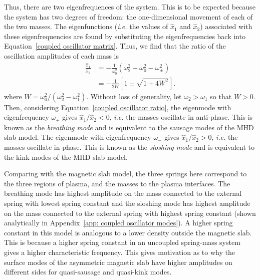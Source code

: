 Thus, there are two eigenfrequences of the system. This is to be expected because the system has two degrees of freedom: the one-dimensional movement of each of the two masses. The eigenfunctions (\textit{i.e.} the values of $\widehat{x}_1$ and $\widehat{x}_2$) associated with these eigenfrequencies are found by substituting the eigenfrequencies back into Equation~\eqref{coupled oscillator matrix}. Thus, we find that the ratio of the oscillation amplitudes of each mass is
\begin{align}
	\frac{\widehat{x}_1}{\widehat{x}_2} & = -\frac{1}{\omega_0^2}(\omega_2^2 + \omega_0^2 - \omega_\pm^2) \\
	& = -\frac{1}{2W}\left[1 \pm \sqrt{1 + 4W^2} \right]. \label{coupled oscillator ratio}
\end{align}
where $W = \omega_0^2 / (\omega_2^2 - \omega_1^2)$. Without loss of generality, let $\omega_2 > \omega_1$ so that $W > 0$. Then, considering Equation~\ref{coupled oscillator ratio}, the eigenmode with eigenfrequency $\omega_+$ gives $\widehat{x}_1 / \widehat{x}_2 < 0$, \textit{i.e.} the masses oscillate in anti-phase. This is known as the \textit{breathing mode} and is equivalent to the sausage modes of the MHD slab model. The eigenmode with eigenfrequency $\omega_-$ gives $\widehat{x}_1 / \widehat{x}_2 > 0$, \textit{i.e.} the masses oscillate in phase. This is known as the \textit{sloshing mode} and is equivalent to the kink modes of the MHD slab model.

Comparing with the magnetic slab model, the three springs here correspond to the three regions of plasma, and the masses to the plasma interfaces. The breathing mode has highest amplitude on the mass connected to the external spring with lowest spring constant and the sloshing mode has highest amplitude on the mass connected to the external spring with highest spring constant (shown analytically in Appendix~\ref{app: coupled oscillator modes}). A higher spring constant in this model is analogous to a lower density outside the magnetic slab. This is because a higher spring constant in an uncoupled spring-mass system gives a higher characteristic frequency. This gives motivation as to why the surface modes of the asymmetric magnetic slab have higher amplitudes on different sides for quasi-sausage and quasi-kink modes.


